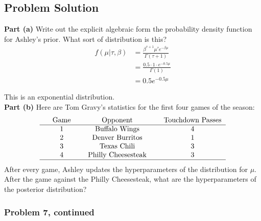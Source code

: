 \documentclass[12pt]{article}
\theoremstyle{definition}
\begin{document}
\newpage
\subsection*{Problem Solution}

\noindent
{\bf Part (a)} Write out the explicit algebraic form the probability density function for Ashley's prior. What sort of distribution is this?
\begin{align*}
f(\mu|\tau, \beta) &= \frac{\beta^{\tau + 1}\mu^\tau e^{-\beta\mu}}{\Gamma(\tau + 1)}\\
&= \frac{0.5 \cdot 1 \cdot e^{-0.5\mu}}{\Gamma(1)}\\
&= 0.5 e^{-0.5\mu}
\end{align*}

This is an exponential distribution.\\

\noindent
{\bf Part (b)} Here are Tom Gravy's statistics for the first four games of the season:
$$
\begin{tabular}{ccccccc}
& Game & & Opponent & & Touchdown Passes\\
\hline
& 1 & & Buffalo Wings & & 4\\
& 2 & & Denver Burritos & & 1\\
& 3 & & Texas Chili & & 3\\
& 4 & & Philly Cheesesteak & & 3\\
\hline
\end{tabular}
$$
After every game, Ashley updates the hyperparameters of the distribution for $\mu$. After the game against the Philly Cheesesteak, what are the hyperparameters of the posterior distribution?
 
\newpage
\subsubsection*{Problem 7, continued}
\end{document}
